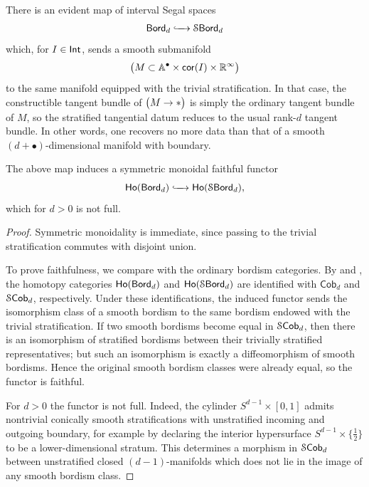 \begin{observation}
    There is an evident map of interval Segal spaces 
    \begin{equation}
        \operatorname{\mathsf{Bord}}_d \xhookrightarrow{\,\,\,\,\,\,\,\,} \operatorname{\mathcal S\mathsf{Bord}}_{d}
    \end{equation}
    which, for $I \in \operatorname{\mathsf{Int}}$, sends a smooth submanifold 
    \begin{equation}
        \big( M\subset \mathbb A^{\bullet}\times \operatorname{{\sf cor}}(I) \times \mathbb R^{\operatorname{\infty}}\big) 
    \end{equation}
    to the same manifold equipped with the trivial stratification. In that case, the constructible tangent bundle of $\big(M \rightarrow *\big)$ is simply the ordinary tangent bundle of $M$, so the stratified tangential datum reduces to the usual rank-$d$ tangent bundle. In other words, one recovers no more data than that of a smooth $(d+\bullet)$-dimensional manifold with boundary.
\end{observation}

\begin{proposition}
    The above map induces a symmetric monoidal faithful functor
    \begin{equation}
        \operatorname{\sf Ho}(\operatorname{\mathsf{Bord}}_d) \xhookrightarrow{\,\,\,\,\,\,\,\,} \operatorname{\sf Ho}(\operatorname{\mathcal S\mathsf{Bord}}_{d}),
    \end{equation}
    which for $d>0$ is not full.
\end{proposition}
\begin{proof}
    Symmetric monoidality is immediate, since passing to the trivial stratification commutes with disjoint union.

    To prove faithfulness, we compare with the ordinary bordism categories. By  and , the homotopy categories $\operatorname{\sf Ho}(\operatorname{\mathsf{Bord}}_d)$ and $\operatorname{\sf Ho}(\operatorname{\mathcal S\mathsf{Bord}}_d)$ are identified with $\mathsf{Cob}_d$ and $\mathcal S\mathsf{Cob}_d$, respectively. Under these identifications, the induced functor sends the isomorphism class of a smooth bordism to the same bordism endowed with the trivial stratification. If two smooth bordisms become equal in $\mathcal S\mathsf{Cob}_d$, then there is an isomorphism of stratified bordisms between their trivially stratified representatives; but such an isomorphism is exactly a diffeomorphism of smooth bordisms. Hence the original smooth bordism classes were already equal, so the functor is faithful.

    For $d>0$ the functor is not full. Indeed, the cylinder $S^{d-1}\times[0,1]$ admits nontrivial conically smooth stratifications with unstratified incoming and outgoing boundary, for example by declaring the interior hypersurface $S^{d-1}\times\{\frac12\}$ to be a lower-dimensional stratum. This determines a morphism in $\mathcal S\mathsf{Cob}_d$ between unstratified closed $(d-1)$-manifolds which does not lie in the image of any smooth bordism class.
\end{proof}


